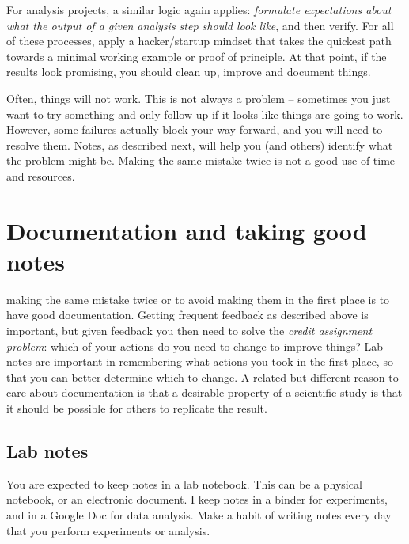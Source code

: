\documentclass{tufte-book}
\begin{document}
For analysis projects, a similar logic again applies: {\it formulate
  expectations about what the output of a given analysis step should
  look like}, and then verify. For all of these processes, apply a
hacker/startup mindset that takes the quickest path towards a minimal
working example or proof of principle. At that point, if the results
look promising, you should clean up, improve and document things.

Often, things will not work. This is not always a problem -- sometimes
you just want to try something and only follow up if it looks like
things are going to work. However, some failures actually block your
way forward, and you will need to resolve them. Notes, as described
next, will help you (and others) identify what the problem might
be. Making the same mistake twice is not a good use of time and
resources.

\section{Documentation and taking good notes}\label{sec:notes}

 making the same mistake twice or to
avoid making them in the first place is to have good
documentation. Getting frequent feedback as described above is
important, but given feedback you then need to solve the {\it credit
  assignment problem}: which of your actions do you need to change to
improve things?  Lab notes
are important in remembering what actions you took in the first place,
so that you can better determine which to change. A related but
different reason to care about documentation is that a desirable
property of a scientific study is that it should be possible for
others to replicate the result.

\subsection{Lab notes}

You are expected to keep notes in a lab notebook. This can be a
physical notebook, or an electronic document. I keep notes in a binder
for experiments, and in a Google Doc for data analysis. Make a habit of writing notes every day that
you perform experiments or analysis.
\end{document}
